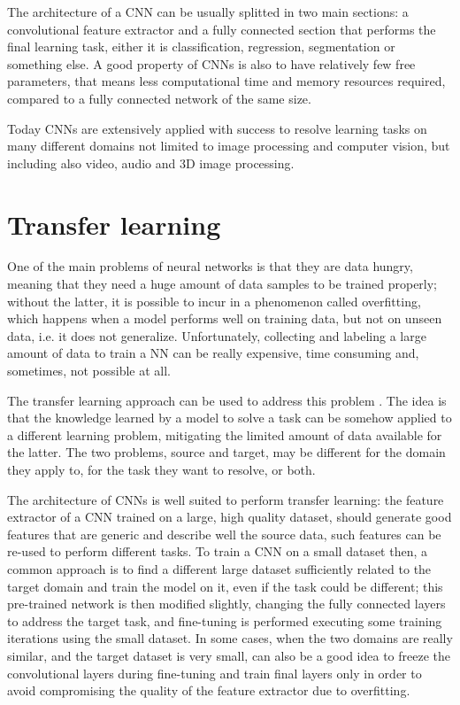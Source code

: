 The architecture of a CNN can be usually splitted in two main sections: a convolutional feature extractor and a fully connected section that performs the final learning task, either it is classification, regression, segmentation or something else.
A good property of CNNs is also to have relatively few free parameters, that means less computational time and memory resources required, compared to a fully connected network of the same size.

Today CNNs are extensively applied with success to resolve learning tasks on many different domains not limited to image processing and computer vision, but including also video, audio and 3D image processing.


\section{Transfer learning}
One of the main problems of neural networks is that they are data hungry, meaning that they need a huge amount of data samples to be trained properly; without the latter, it is possible to incur in a phenomenon called overfitting, which happens when a model performs well on training data, but not on unseen data, i.e. it does not generalize.
Unfortunately, collecting and labeling a large amount of data to train a NN can be really expensive, time consuming and, sometimes, not possible at all.

The transfer learning approach can be used to address this problem \cite{ribani2019survey}.
The idea is that the knowledge learned by a model to solve a task can be somehow applied to a different learning problem, mitigating the limited amount of data available for the latter.
The two problems, source and target, may be different for the domain they apply to, for the task they want to resolve, or both.

The architecture of CNNs is well suited to perform transfer learning: the feature extractor of a CNN trained on a large, high quality dataset, should generate good features that are generic and describe well the source data, such features can be re-used to perform different tasks.
To train a CNN on a small dataset then, a common approach is to find a different large dataset sufficiently related to the target domain and train the model on it, even if the task could be different; this pre-trained network is then modified slightly, changing the fully connected layers to address the target task, and fine-tuning is performed executing some training iterations using the small dataset.
In some cases, when the two domains are really similar, and the target dataset is very small, can also be a good idea to freeze the convolutional layers during fine-tuning and train final layers only in order to avoid compromising the quality of the feature extractor due to overfitting.

